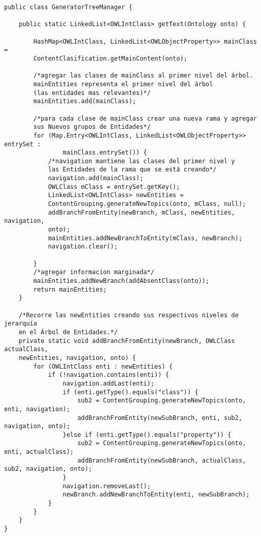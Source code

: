 \begin{verbatim}
public class GeneratorTreeManager {

    public static LinkedList<OWLIntClass> getText(Ontology onto) {

        HashMap<OWLIntClass, LinkedList<OWLObjectProperty>> mainClass =
        ContentClasification.getMainContent(onto);
        
        /*agregar las clases de mainClass al primer nivel del árbol. 
        mainEntities representa el primer nivel del árbol 
        (las entidades mas relevantes)*/
        mainEntities.add(mainClass);
        
        /*para cada clase de mainClass crear una nueva rama y agregar 
        sus Nuevos grupos de Entidades*/
        for (Map.Entry<OWLIntClass, LinkedList<OWLObjectProperty>> entrySet : 
                mainClass.entrySet()) {
            /*navigation mantiene las clases del primer nivel y
            las Entidades de la rama que se está creando*/
            navigation.add(mainClass);
            OWLClass mClass = entrySet.getKey();
            LinkedList<OWLIntClass> newEntities =
            ContentGrouping.generateNewTopics(onto, mClass, null);
            addBranchFromEntity(newBranch, mClass, newEntities, navigation,
            onto);
            mainEntities.addNewBranchToEntity(mClass, newBranch);
            navigation.clear();
            
        }
        /*agregar informacion marginada*/
        mainEntities.addNewBranch(addAbsentClass(onto));
        return mainEntities;
    }
    
    /*Recorre las newEntities creando sus respectivos niveles de jerarquía 
    en el Árbol de Entidades.*/
    private static void addBranchFromEntity(newBranch, OWLClass actualClass,
    newEntities, navigation, onto) {
        for (OWLIntClass enti : newEntities) {
            if (!navigation.contains(enti)) {
                navigation.addLast(enti);
                if (enti.getType().equals("class")) {
                    sub2 = ContentGrouping.generateNewTopics(onto, enti, navigation);
                    addBranchFromEntity(newSubBranch, enti, sub2, navigation, onto);
                }else if (enti.getType().equals("property")) {
                    sub2 = ContentGrouping.generateNewTopics(onto, enti, actualClass);
                    addBranchFromEntity(newSubBranch, actualClass, sub2, navigation, onto);
                }
                navigation.removeLast();
                newBranch.addNewBranchToEntity(enti, newSubBranch);
            }
        }
    }
}

\end{verbatim}
